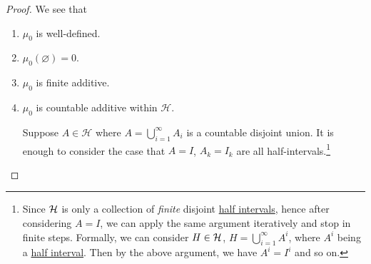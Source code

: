 \begin{proof}
	We see that
	\begin{enumerate}
		\item \(\mu _0\) is well-defined.
		\item \(\mu _0(\varnothing ) = 0\).
		\item \(\mu _0\) is finite additive.
		\item \(\mu _0\) is countable additive within \(\mathcal{H}\).
		      \par Suppose \(A\in \mathcal{H} \) where \(A = \bigcup\limits_{i=1}^{\infty} A_{i}\) is a countable
		      disjoint union. It is enough to consider the case that \(A = I\), \(A_{k} = I_{k}\) are all
		      half-intervals.\footnote{Since \(\mathcal{\MakeUppercase{H}}\) is only a collection of \emph{finite} disjoint \hyperref[def:half-intervals]{half intervals}, hence
			      after considering \(A = I\), we can apply the same argument iteratively and stop in finite steps. Formally, we can consider \(H\in \mathcal{\MakeUppercase{H}} \),
			      \(H = \bigcup\limits_{i=1}^{\infty} A^{i}\), where \(A^i\) being a \hyperref[def:half-intervals]{half interval}. Then by the above argument, we have \(A^i = I^i\) and so on.}


\end{enumerate}
\end{proof}
